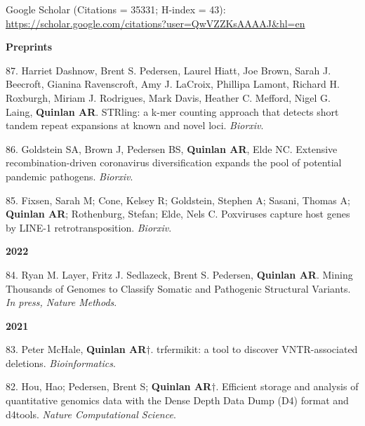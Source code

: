 \documentclass[margin,line]{cv}
\begin{document}
\begin{resume}
    Google Scholar (Citations = 35331; H-index = 43): \url{https://scholar.google.com/citations?user=QwVZZKsAAAAJ&hl=en}

    \textbf{Preprints} \\

    \begin{list}{*}{}

    \item[87.] Harriet Dashnow, Brent S. Pedersen, Laurel Hiatt, Joe Brown, Sarah J. Beecroft, Gianina Ravenscroft, Amy J. LaCroix, Phillipa Lamont, Richard H. Roxburgh, Miriam J. Rodrigues, Mark Davis, Heather C. Mefford, Nigel G. Laing, \textbf{Quinlan AR}. 
    STRling: a k-mer counting approach that detects short tandem repeat expansions at known and novel loci. \emph{Biorxiv}. 

    \item[86.] Goldstein SA, Brown J, Pedersen BS, \textbf{Quinlan AR}, Elde NC. Extensive recombination-driven coronavirus diversification expands the pool of potential pandemic pathogens. \emph{Biorxiv}. 

    \item[85.] Fixsen, Sarah M; Cone, Kelsey R; Goldstein, Stephen A; Sasani, Thomas A; \textbf{Quinlan AR}; Rothenburg, Stefan; Elde, Nels C. Poxviruses capture host genes by LINE-1 retrotransposition. \emph{Biorxiv}. 


    \end{list}   
    
    \textbf{2022} \\

    \begin{list}{*}{}

    \item[84.] Ryan M. Layer, Fritz J. Sedlazeck, Brent S. Pedersen, \textbf{Quinlan AR}. Mining Thousands of Genomes to Classify Somatic and Pathogenic Structural Variants. \emph{In press, Nature Methods}. 

    \end{list}   

    \textbf{2021} \\

    \begin{list}{*}{}

    \item[83.] Peter McHale, \textbf{Quinlan AR}$\dagger$. trfermikit: a tool to discover VNTR-associated deletions. \emph{Bioinformatics}. 

    \item[82.] Hou, Hao; Pedersen, Brent S; \textbf{Quinlan AR}$\dagger$.  Efficient storage and analysis of quantitative genomics data with the Dense Depth Data Dump (D4) format and d4tools. \emph{Nature Computational Science}. 


\end{list}
\end{resume}
\end{document}

